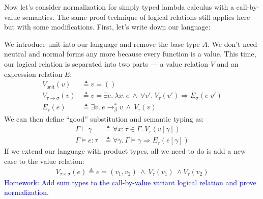 \documentclass{notes}
\begin{document}
Now let's consider normalization for simply typed lambda calculus with a call-by-value semantics.
%
The same proof technique of logical relations still applies here but with some modifications.
%
First, let's write down our language:
%
\begin{syntax}
  \category[Types]{\tau, \sigma}
  \alternative{\tau \rightarrow \sigma}

  \alternative{()}

  \alternative{()}
\end{syntax}
%
We introduce unit into our language and remove the base type $A$.
%
We don't need neutral and normal forms any more because every function is a value.
%
This time, our logical relation is separated into two parts --- a value relation $V$ and an expression relation $E$:
%
\begin{align*}
  V_{\textsf{unit}}(v) & \triangleq v = () \\
  V_{\tau \rightarrow \sigma}(v) & \triangleq v = \exists e.\ \lambda x.\, e \ \wedge \ \forall v'.\ V_{\tau}(v') \Longrightarrow E_{\sigma}(e \; v') \\
  E_{\tau}(e) & \triangleq \exists v.\ e \longrightarrow_{\beta}^* v \ \wedge \ V_{\tau}(v)
\end{align*}
%
We can then define ``good'' substitution and semantic typing as:
%
\begin{align*}
  \Gamma \vdash \gamma & \triangleq \forall x : \tau \in \Gamma.\ V_{\tau}(v[\gamma]) \\
  \Gamma \vDash e : \tau & \triangleq \forall \gamma.\: \Gamma \vDash \gamma \Longrightarrow E_{\tau}(e[\gamma])
\end{align*}
%
If we extend our language with product types, all we need to do is add a new case to the value relation:
%
\begin{align*}
  V_{\tau \times \sigma}(e) \triangleq e = (v_1, v_2) \ \wedge \ V_\tau(v_1) \ \wedge V_\tau(v_2)
\end{align*}
%
\textcolor{blue}{Homework: Add sum types to the call-by-value variant logical relation and prove normalization.}
\end{document}
